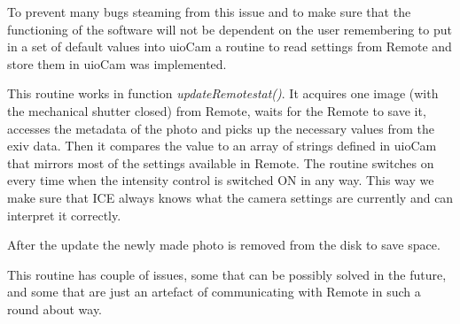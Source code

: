 \documentclass[]{book}
\begin{document}
		To prevent many bugs steaming from this issue and to make sure that the functioning of the software will not be dependent on the user remembering to put in a set of default values into uioCam a routine to read settings from Remote and store them in uioCam was implemented.
		
		This routine works in function \textit{updateRemotestat()}. It acquires one image (with the mechanical shutter closed) from Remote, waits for the Remote to save it, accesses the metadata of the photo and picks up the necessary values from the exiv data. Then it compares the value to an array of strings defined in uioCam that mirrors most of the settings available in Remote. The routine switches on every time when the intensity control is switched ON in any way. This way we make sure that ICE always knows what the camera settings are currently and can interpret it correctly.
		
		After the update the newly made photo is removed from the disk to save space.
		
		This routine has couple of issues, some that can be possibly solved in the future, and some that are just an artefact of communicating with Remote in such a round about way.
		
\end{document}
